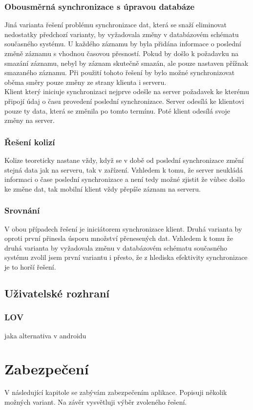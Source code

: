 \documentclass{bakalarka}
\begin{document}
\subsection{Obousměrná synchronizace s úpravou databáze}
Jiná varianta řešení problému synchronizace dat, která se snaží eliminovat nedostatky předchozí varianty, by vyžadovala změny v databázovém schématu současného systému. U každého záznamu by byla přidána informace o poslední změně záznamu s vhodnou časovou přesností. Pokud by došlo k požadavku na smazání záznamu, nebyl by záznam skutečně smazán, ale pouze nastaven přížnak smazaného záznamu. Při použití tohoto řešení by bylo možné synchronizovat oběma směry pouze změny ze strany klienta i serveru. \\ \indent
Klient který iniciuje synchronizaci nejprve odešle na server požadavek ke kterému připojí údaj o času provedení poslední synchronizace. Server odesílá ke klientovi pouze ty data, která se změnila po tomto termínu. Poté klient odesílá svoje změny na server.

\subsection{Řešení kolizí}
Kolize teoreticky nastane vždy, když se v době od poslední synchronizace změní stejná data jak na serveru, tak v zařízení. Vzhledem k tomu, že server neukládá informaci o čase poslední synchronizace a není tedy možné zjistit že vůbec došlo ke změne dat, tak mobilní klient vždy přepíše záznam na serveru.

\subsection{Srovnání}
V obou případech řešení je iniciátorem synchronizace klient. Druhá varianta by oproti první přinesla úsporu množství přenesených dat. Vzhledem k tomu že druhá varianta by vyžadovala změnu v databázovém schématu současného systému zvolil jsem první variantu i přesto, že z hlediska efektivity synchronizace je to horší řešení.

\section{Uživatelské rozhraní}
\subsection{LOV}
jaka alternativa v androidu

\chapter{Zabezpečení}
V následující kapitole se zabývám zabezpečením aplikace. Popisuji několik možných variant. Na závěr vysvětluji výběr zvoleného řešení.
\end{document}
